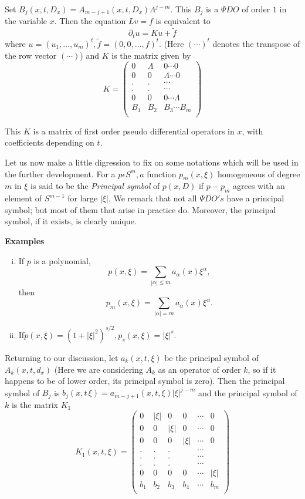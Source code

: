 Set $B_j (x,t,D_x) = A_{m-j+1}(x,t,D_x) \Lambda^{j-m}$. This $B_j$ is
a $\Psi DO$ of order $1$ in the variable $x$. Then the equation $Lv
=f$ is equivalent to  
$$
\partial_t u= Ku + \tilde{f}
$$\pageoriginale
where $u = (u_1, \ldots, u_m)^t,  \tilde{f} = (0,0,\ldots,  f)^t
$. (Here $(\cdots)^t$  denotes the transpose of the row vector
$(\cdots) $)  and   $K$ is  the matrix given by  
$$
K=
\begin{pmatrix}
0& \Lambda &0 \cdots 0\\
0& 0 &\Lambda \cdots 0\\
.& . & \cdots \\
.& . & \cdots \\
0& 0 &0 \cdots \Lambda\\
B_1& B_2 &B_3 \cdots B_m\\
\end{pmatrix}
$$

This $K$ is a matrix of first order pseudo differential operators in
$x$, with coefficients depending on $t$. 

Let   us now make a little digression to fix on some notations which
will be used in the further development. For a $p \epsilon S^m, a
$ function $p_m ( x, \xi )$ homogeneous of degree $m$ in $\xi$ is said
to be the \textit{Principal symbol} of $p(x,D)$ if $p- p_m$ agrees
with an element of $S^{m-1}$ for large $|\xi|$. We remark that not
all $\Psi DO's $ have a principal symbol; but most  of them that
arise in practice do. Moreover, the principal symbol, if it  exists,
is clearly unique. 

\medskip
\noindent \textbf{Examples}

\begin{enumerate}[(i)]
\item{If $p$ is a polynomial,}
  $$ 
  p(x, \xi) = \sum_{| \alpha| \leq  m} a_{\alpha}( x) \xi ^ {\alpha},
  $$
  then
  $$
  p_m (x, \xi) = \sum_{| \alpha |= m} a _{\alpha}(x) \xi ^{\alpha}.
  $$
\item If\pageoriginale $p(x,\xi)= (1 + | \xi | ^2 ) ^{s/2}, p_s(x,\xi ) = | \xi |^s$. 
\end{enumerate}

Returning to our discussion,  let $ a_k(x,t, \xi)$  be the principal
symbol of $A_k (x,t,d_x)$ (Here we are considering $A_k$ as an
operator of order $k$, so if it happens to be of lower order, its
principal symbol is zero). Then the principal symbol of $B_j $ is $b_j
(x, t\, \xi ) = a_{m-j+1}(x,t,  \xi)| \xi |^{j-m}$ and the principal
symbol of $k$ is  the matrix $K_1$  
$$
K_1 (x,t, \xi)=	
\begin{pmatrix}
  0& |\xi|& 0& 0& \cdots&0\\
  0&0&  |\xi|&0 & \cdots &0\\
  0& 0&0&  |\xi|& \cdots&0\\
  .&.&.& &\cdots& \\
  .&.&.& &\cdots& \\
  .&.&.& &\cdots& \\
  0&0&0&0&\cdots& |\xi|\\
  b_1&b_2&b_3&b_4& \cdots& b_m\\
\end{pmatrix}
$$

